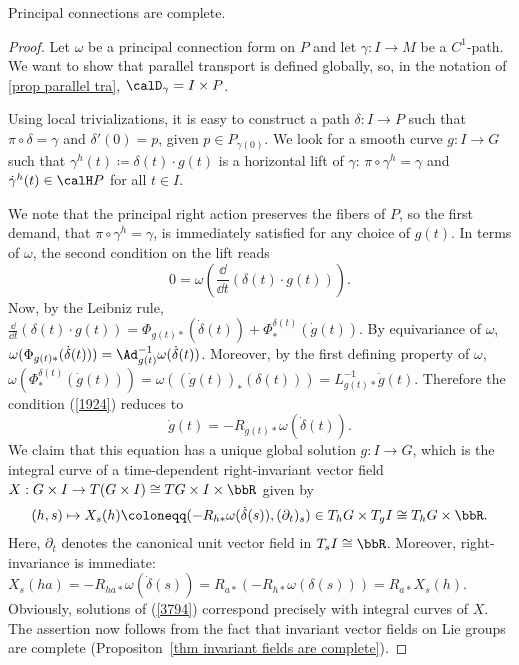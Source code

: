 \begin{prop}
    Principal connections are complete.
\end{prop}
\begin{proof}
    Let $\omega$ be a principal connection form on $P$ and let $\gamma:I\to M$ be a $C^1$-path. We want to show that parallel transport is defined globally, so, in the notation of \ref{prop parallel tra}, $\calD_\gamma=I\times P$.

    Using local trivializations, it is easy to construct a path $\delta:I\to P$ such that $\pi\circ\delta=\gamma$ and $\delta'(0)=p$, given $p\in P_{\gamma(0)}$. We look for a smooth curve $g:I\to G$ such that $\gamma^h(t)\coloneqq \delta(t)\cdot g(t)$ is a horizontal lift of $\gamma$: $\pi\circ\gamma^h=\gamma$ and $\dot\gamma^h(t)\in \calH P$ for all $t\in I$. 

    We note that the principal right action preserves the fibers of $P$, so the first demand, that $\pi\circ \gamma^h=\gamma$, is immediately satisfied for any choice of $g(t)$. In terms of $\omega$, the second condition on the lift reads
    \[0=\omega\left(\frac{\dd}{\dd t}(\delta(t)\cdot g(t))\right).\label{1924}\]
    Now, by the Leibniz rule, $\frac{\dd}{\dd t}(\delta(t)\cdot g(t))=\Phi_{g(t)\ast}(\dot\delta(t))+\Phi^{\delta(t)}_\ast(\dot g(t))$. By equivariance of $\omega$, $\omega(\Phi_{g(t)\ast}(\dot\delta(t)))=\Ad_{g(t)}^{-1}\omega(\dot\delta(t))$. Moreover, by the first defining property of $\omega$, $\omega(\Phi^{\delta(t)}_\ast(\dot g(t)))=\omega((\dot g(t))_{\ast}(\delta(t)))=L_{g(t)\ast}^{-1}\dot g(t)$. Therefore the condition (\ref{1924}) reduces to
    \[\dot g(t)=-R_{g(t)\ast}\omega(\dot\delta(t)).\label{3794}\]
    We claim that this equation has a unique global solution $g:I\to G$, which is the integral curve of a time-dependent right-invariant vector field $X: G\times I\to T(G\times I)\cong TG\times I\times \bbR$ given by
    \[(h,s)\mapsto X_s(h)\coloneqq (-R_{h\ast}\omega(\dot\delta(s)),(\partial_t)_s)\in T_hG\times T_gI\cong T_hG\times \bbR.\]
    Here, $\partial_t$ denotes the canonical unit vector field in $T_sI\cong\bbR$. Moreover, right-invariance is immediate: $X_s(ha)=-R_{ha\ast}\omega(\dot\delta(s))=R_{a\ast}(-R_{h\ast}\omega(\delta(s)))=R_{a\ast}X_s(h)$. Obviously, solutions of (\ref{3794}) correspond precisely with integral curves of $X$. The assertion now follows from the fact that invariant vector fields on Lie groups are complete (Propositon~\ref{thm invariant fields are complete}).
\end{proof}

